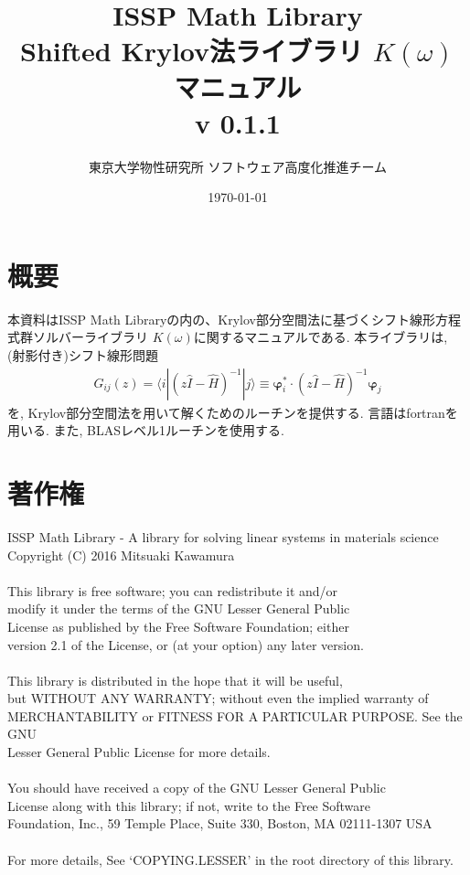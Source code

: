 \documentclass[12pt,titlepage]{jarticle}
\begin{document}
%
%
\title{ISSP Math Library \\
  Shifted Krylov法ライブラリ $K(\omega)$ マニュアル\\
  v 0.1.1}
\author{東京大学物性研究所 ソフトウェア高度化推進チーム}
\date{\today}
\maketitle
%

%
%
\tableofcontents

\section{概要}

本資料はISSP Math Libraryの内の、Krylov部分空間法に基づくシフト線形方程式群ソルバーライブラリ
$K(\omega)$に関するマニュアルである.
本ライブラリは, (射影付き)シフト線形問題
\begin{align}
  G_{i j}(z) = \langle i | (z {\hat I} -{\hat H})^{-1}| j \rangle \equiv 
  {\boldsymbol \varphi}_i^{*} \cdot (z{\hat I}-{\hat H})^{-1} {\boldsymbol \varphi}_j
\end{align}
を, Krylov部分空間法を用いて解くためのルーチンを提供する.
言語はfortranを用いる. 
また, BLASレベル1ルーチンを使用する.

\section{著作権}

\noindent
ISSP Math Library - A library for solving linear systems in materials science \\
Copyright (C) 2016 Mitsuaki Kawamura \\
 \\
This library is free software; you can redistribute it and/or \\
modify it under the terms of the GNU Lesser General Public \\
License as published by the Free Software Foundation; either \\
version 2.1 of the License, or (at your option) any later version. \\
 \\
This library is distributed in the hope that it will be useful, \\
but WITHOUT ANY WARRANTY; without even the implied warranty of \\
MERCHANTABILITY or FITNESS FOR A PARTICULAR PURPOSE.  See the GNU \\
Lesser General Public License for more details. \\
 \\
You should have received a copy of the GNU Lesser General Public \\
License along with this library; if not, write to the Free Software \\
Foundation, Inc., 59 Temple Place, Suite 330, Boston, MA  02111-1307  USA \\
 \\
For more details, See `COPYING.LESSER' in the root directory of this library.
\end{document}
